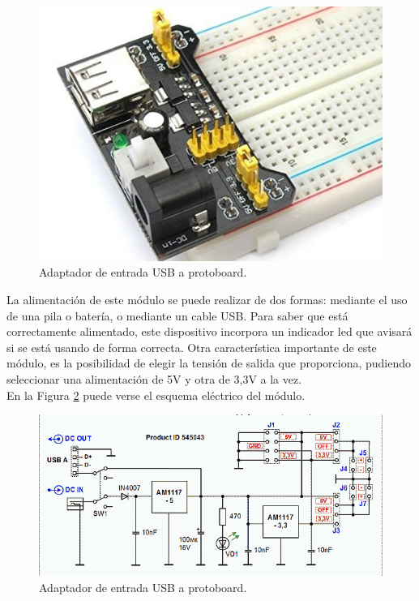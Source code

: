 \begin{figure}[H]
  \begin{center}
    \includegraphics[scale=0.3]{imagenes/alimentador_usb_protoboard.jpg}
  \end{center}
  \caption{Adaptador de entrada USB a protoboard.}
  \label{figura:alimentador_usb_protoboard}
\end{figure}

La alimentación de este módulo se puede realizar de dos formas: mediante el uso de una pila o batería, o mediante un cable USB. Para saber que está correctamente alimentado, este 
dispositivo incorpora un indicador led que avisará si se está usando de forma correcta. Otra característica importante de este módulo, es la posibilidad de elegir la tensión de
salida que proporciona, pudiendo seleccionar una alimentación de 5V y otra de 3,3V a la vez.\\

En la Figura \ref{figura:alimentador_usb_protoboard_esquema} puede verse el esquema eléctrico del módulo.\\

\begin{figure}[H]
  \begin{center}
    \includegraphics[scale=0.5]{imagenes/esquema_alimentador_protoboard.png}
  \end{center}
  \caption{Adaptador de entrada USB a protoboard.}
  \label{figura:alimentador_usb_protoboard_esquema}
\end{figure}

